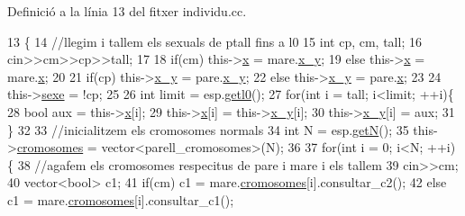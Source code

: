 Definició a la línia 13 del fitxer individu.\+cc.


\begin{DoxyCode}
13                                                                              \{
14         \textcolor{comment}{//llegim i tallem els sexuals de ptall fins a l0}
15         \textcolor{keywordtype}{int} cp, cm, tall;
16         cin>>cm>>cp>>tall;
17 
18         \textcolor{keywordflow}{if}(cm) this->\hyperlink{classindividu_a3c4abda8daead156b5519f69bd224fa9}{x} = mare.\hyperlink{classindividu_a51eb7827fdd5bd5302e3c962fd719fc0}{x\_y};
19         \textcolor{keywordflow}{else} this->\hyperlink{classindividu_a3c4abda8daead156b5519f69bd224fa9}{x} = mare.\hyperlink{classindividu_a3c4abda8daead156b5519f69bd224fa9}{x};
20 
21         \textcolor{keywordflow}{if}(cp) this->\hyperlink{classindividu_a51eb7827fdd5bd5302e3c962fd719fc0}{x\_y} = pare.\hyperlink{classindividu_a51eb7827fdd5bd5302e3c962fd719fc0}{x\_y};
22         \textcolor{keywordflow}{else} this->\hyperlink{classindividu_a51eb7827fdd5bd5302e3c962fd719fc0}{x\_y} = pare.\hyperlink{classindividu_a3c4abda8daead156b5519f69bd224fa9}{x};
23 
24         this->\hyperlink{classindividu_ab62faa6985cc0520c33a206fc5a89e37}{sexe} = !cp;
25 
26         \textcolor{keywordtype}{int} limit = esp.\hyperlink{classespecie_a712aef06aad58b482d136980200600f5}{getl0}();
27         \textcolor{keywordflow}{for}(\textcolor{keywordtype}{int} i = tall; i<limit; ++i)\{
28                 \textcolor{keywordtype}{bool} aux = this->\hyperlink{classindividu_a3c4abda8daead156b5519f69bd224fa9}{x}[i];
29                 this->\hyperlink{classindividu_a3c4abda8daead156b5519f69bd224fa9}{x}[i] = this->\hyperlink{classindividu_a51eb7827fdd5bd5302e3c962fd719fc0}{x\_y}[i];
30                 this->\hyperlink{classindividu_a51eb7827fdd5bd5302e3c962fd719fc0}{x\_y}[i] = aux;
31         \}
32 
33         \textcolor{comment}{//inicialitzem els cromosomes normals}
34         \textcolor{keywordtype}{int} N = esp.\hyperlink{classespecie_a1af7a5322803c26b43fc5b83e089f6d1}{getN}();
35         this->\hyperlink{classindividu_ae5e0a83ff9e943cbcdf95b74069ad3a7}{cromosomes} = vector<parell\_cromosomes>(N);
36 
37         \textcolor{keywordflow}{for}(\textcolor{keywordtype}{int} i = 0; i<N; ++i)\{
38                 \textcolor{comment}{//agafem els cromosomes respecitus de pare i mare i els tallem}
39                 cin>>cm;
40                 vector<bool> c1;
41                 \textcolor{keywordflow}{if}(cm) c1 = mare.\hyperlink{classindividu_ae5e0a83ff9e943cbcdf95b74069ad3a7}{cromosomes}[i].consultar\_c2();
42                 \textcolor{keywordflow}{else} c1 = mare.\hyperlink{classindividu_ae5e0a83ff9e943cbcdf95b74069ad3a7}{cromosomes}[i].consultar\_c1();

\end{DoxyCode}
